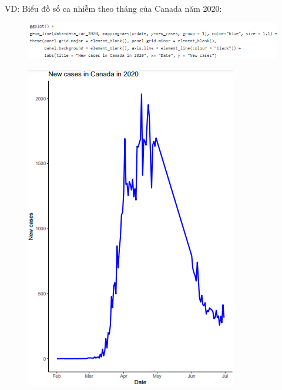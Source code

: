 \documentclass[a4paper]{article}
\theoremstyle{definition}
\begin{document}
\begin{enumerate}[i)]
\begin{enumerate}[1]
    VD: Biểu đồ số ca nhiễm theo tháng của Canada năm 2020:
                \begin{figure}[H]
				    \centering
				    \includegraphics[scale=0.9]{images/5.0.3.png}
		    	\end{figure}
		    	\begin{figure}[H]
				    \centering
				    \includegraphics[scale=0.8]{images/5.1.png}
		    	\end{figure}
		    	\begin{figure}[H]
				    \centering

\end{figure}
\end{enumerate}
\end{enumerate}
\end{document}
